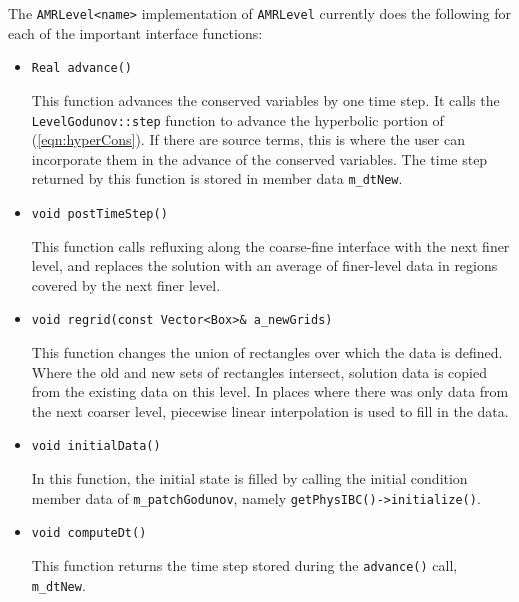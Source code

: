 The {\tt AMRLevel<name>} implementation of {\tt AMRLevel}
currently does the following for each of the important interface
functions:
\begin{itemize}
\item \begin{small} \begin{verbatim}
Real advance()
\end{verbatim}\end{small}
This function advances the conserved variables by one time step.  It
calls the {\tt LevelGodunov::step} function to advance the hyperbolic
portion of (\ref{eqn:hyperCons}).  If there are source terms, this is
where the user can incorporate them in the advance of the conserved
variables.  The time step returned by this function is stored in
member data \verb/m_dtNew/.

\item \begin{small} \begin{verbatim}
void postTimeStep()
\end{verbatim}\end{small}
This function calls refluxing along the coarse-fine interface with the
next finer level, and replaces the solution with an average of
finer-level data in regions covered by the next finer level.  

\item \begin{small} \begin{verbatim}
void regrid(const Vector<Box>& a_newGrids)
\end{verbatim}\end{small}
This function changes the union of rectangles over which the data is
defined.  Where the old and new sets of rectangles intersect, solution
data is copied from the existing data on this level. In places where
there was only data from the next coarser level, piecewise linear
interpolation is used to fill in the data.  

\item \begin{small} \begin{verbatim}
void initialData()
\end{verbatim}\end{small}
In this function, the initial state is filled by calling
the initial condition member data of \verb/m_patchGodunov/, namely
\verb/getPhysIBC()->initialize()/.    

\item \begin{small} \begin{verbatim}
void computeDt()
\end{verbatim}\end{small}
This function returns the time step stored during
the \verb/advance()/ call, \verb/m_dtNew/.


\end{itemize}
